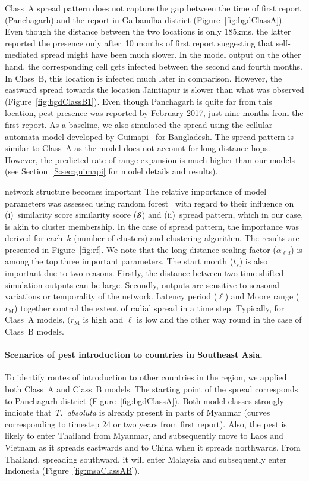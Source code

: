 \documentclass[11pt]{article}
\newcommand{\tuta}{\emph{T.~absoluta}}
\newcommand{\similarity}{\mathcal{S}}
\newcommand{\ald}{\alpha_{\ell d}}
\newcommand{\mooreRange}{r_\mathrm{M}}
\theoremstyle{definition}
\begin{document}
Class~A spread pattern does not capture the gap between the time of first
report (Panchagarh) and the report in Gaibandha district
(Figure~\ref{fig:bgdClassA}). Even though the distance between the two
locations is only $185$kms, the latter reported the presence only after~10
months of first report suggesting that self-mediated spread might have been
much slower. In the model output on the other hand, the corresponding cell
gets infected between the second and fourth months.  In Class~B, this
location is infected much later in comparison. However, the eastward spread
towards the location Jaintiapur is slower than what was observed
(Figure~\ref{fig:bgdClassB1}). Even though Panchagarh is quite far from
this location, pest presence was reported by February 2017, just nine
months from the first report.  As a baseline, we also simulated the spread
using the cellular automata model developed by
Guimapi~\cite{guimapi2016modeling} for Bangladesh. The spread pattern is
similar to Class~A as the model does not account for long-distance hops.
However, the predicted rate of range expansion is much higher than our
models (see Section~\ref{S:sec:guimapi} for model details and results).

network structure becomes important
The relative importance of model parameters was assessed using random
forest~\cite{breiman2001random} with regard to their influence on
(i)~similarity score similarity score ($\similarity$) and (ii)~spread
pattern, which in our case, is akin to cluster membership. In the case of
spread pattern, the importance was derived for each~$k$ (number of
clusters) and clustering algorithm. The results are presented in
Figure~\ref{fig:rf}. We note that the long distance scaling factor ($\ald$)
is among the top three important parameters. The start month ($t_s$) is
also important due to two reasons. Firstly, the distance between two time
shifted simulation outputs can be large. Secondly, outputs are sensitive to
seasonal variations or temporality of the network.  Latency period ($\ell$)
and Moore range ($\mooreRange$) together control the extent of radial
spread in a time step. Typically, for Class~A models, $(\mooreRange$ is
high and $\ell$ is low and the other way round in the case of Class~B
models.

\paragraph{Scenarios of pest introduction to countries in Southeast Asia.}
To identify routes of introduction to other countries in the region, we
applied both Class~A and Class~B models. The starting point of the spread
corresponds to Panchagarh district (Figure~\ref{fig:bgdClassA}). Both model
classes strongly indicate that \tuta{} is already present in parts of
Myanmar (curves corresponding to timestep 24 or two years from first
report). Also, the pest is likely to enter Thailand from Myanmar, and
subsequently move to Laos and Vietnam as it spreads eastwards and to China
when it spreads northwards. From Thailand, spreading southward, it will
enter Malaysia and subsequently enter Indonesia
(Figure~\ref{fig:msaClassAB}).
\end{document}
